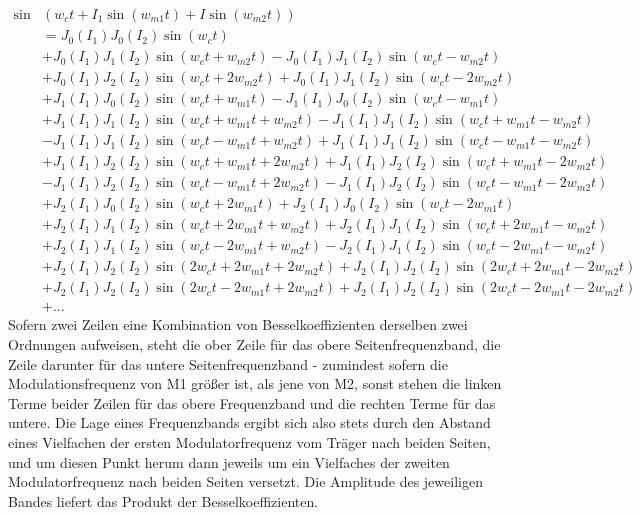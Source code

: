 \begin{equation}\label{eq:wallofequations}
\begin{split}
\sin&(w_ct + I_1\sin(w_{m1}t) + I\sin(w_{m2}t)) \\
&= J_0(I_1)J_0(I_2)\sin(w_ct) \\
&+ J_0(I_1)J_1(I_2)\sin(w_ct + w_{m2}t) - J_0(I_1)J_1(I_2)\sin(w_ct - w_{m2}t) \\
&+ J_0(I_1)J_2(I_2)\sin(w_ct + 2w_{m2}t) + J_0(I_1)J_1(I_2)\sin(w_ct - 2w_{m2}t) \\
&+ J_1(I_1)J_0(I_2)\sin(w_ct + w_{m1}t) - J_1(I_1)J_0(I_2)\sin(w_ct - w_{m1}t) \\
&+ J_1(I_1)J_1(I_2)\sin(w_ct + w_{m1}t + w_{m2}t) - J_1(I_1)J_1(I_2)\sin(w_ct + w_{m1}t - w_{m2}t) \\
&- J_1(I_1)J_1(I_2)\sin(w_ct - w_{m1}t + w_{m2}t) + J_1(I_1)J_1(I_2)\sin(w_ct - w_{m1}t - w_{m2}t) \\
&+ J_1(I_1)J_2(I_2)\sin(w_ct + w_{m1}t + 2w_{m2}t) + J_1(I_1)J_2(I_2)\sin(w_ct + w_{m1}t - 2w_{m2}t) \\
&- J_1(I_1)J_2(I_2)\sin(w_ct - w_{m1}t + 2w_{m2}t) - J_1(I_1)J_2(I_2)\sin(w_ct - w_{m1}t - 2w_{m2}t) \\
&+ J_2(I_1)J_0(I_2)\sin(w_ct + 2w_{m1}t) + J_2(I_1)J_0(I_2)\sin(w_ct - 2w_{m1}t) \\
&+ J_2(I_1)J_1(I_2)\sin(w_ct + 2w_{m1}t + w_{m2}t) + J_2(I_1)J_1(I_2)\sin(w_ct + 2w_{m1}t - w_{m2}t) \\
&+ J_2(I_1)J_1(I_2)\sin(w_ct - 2w_{m1}t + w_{m2}t) - J_2(I_1)J_1(I_2)\sin(w_ct - 2w_{m1}t - w_{m2}t) \\
&+ J_2(I_1)J_2(I_2)\sin(2w_ct + 2w_{m1}t + 2w_{m2}t) + J_2(I_1)J_2(I_2)\sin(2w_ct + 2w_{m1}t - 2w_{m2}t) \\
&+ J_2(I_1)J_2(I_2)\sin(2w_ct - 2w_{m1}t + 2w_{m2}t) + J_2(I_1)J_2(I_2)\sin(2w_ct - 2w_{m1}t - 2w_{m2}t) \\
&+ ... 
\end{split}
\end{equation}
Sofern zwei Zeilen eine Kombination von Besselkoeffizienten derselben zwei Ordnungen aufweisen, steht die ober Zeile für das obere Seitenfrequenzband, die Zeile darunter für das untere Seitenfrequenzband - zumindest sofern die Modulationsfrequenz von M1 größer ist, als jene von M2, sonst stehen die linken Terme beider Zeilen für das obere Frequenzband und die rechten Terme für das untere. Die Lage eines Frequenzbands ergibt sich also stets durch den Abstand eines Vielfachen der ersten Modulatorfrequenz vom Träger nach beiden Seiten, und um diesen Punkt herum dann jeweils um ein Vielfaches der zweiten Modulatorfrequenz nach beiden Seiten versetzt. Die Amplitude des jeweiligen Bandes liefert das Produkt der Besselkoeffizienten. \\
